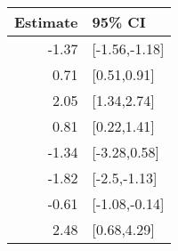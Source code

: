 \begin{tabular}{rl}
  \hline
Estimate & 95\% CI \\ 
  \hline
-1.37 & [-1.56,-1.18] \\ 
  0.71 & [0.51,0.91] \\ 
  2.05 & [1.34,2.74] \\ 
  0.81 & [0.22,1.41] \\ 
  -1.34 & [-3.28,0.58] \\ 
  -1.82 & [-2.5,-1.13] \\ 
  -0.61 & [-1.08,-0.14] \\ 
  2.48 & [0.68,4.29] \\ 
   \hline
\end{tabular}

